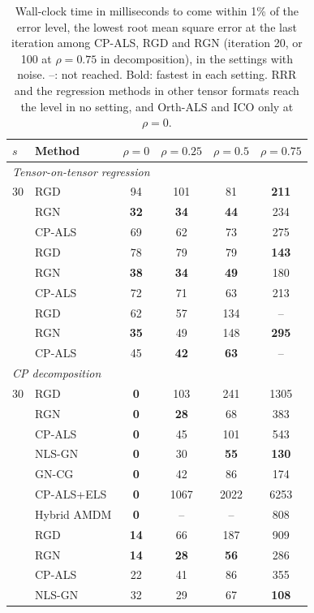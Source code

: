 \begin{table}[!htbp]
\centering
\caption{Wall-clock time in milliseconds to come within 1\% of the error level, the lowest root mean square error at the last iteration among CP-ALS, RGD and RGN (iteration 20, or 100 at $\rho=0.75$ in decomposition), in the settings with noise. --: not reached. Bold: fastest in each setting. RRR and the regression methods in other tensor formats reach the level in no setting, and Orth-ALS and ICO only at $\rho=0$.}
\label{tab:time_to_level}
{\small
\begin{tabular}{llcccc}
\toprule
$s$ & Method & $\rho=0$ & $\rho=0.25$ & $\rho=0.5$ & $\rho=0.75$ \\
\midrule
\multicolumn{6}{l}{\emph{Tensor-on-tensor regression}} \\
30 & RGD & 94 & 101 & 81 & \textbf{211} \\
 & RGN & \textbf{32} & \textbf{34} & \textbf{44} & 234 \\
 & CP-ALS & 69 & 62 & 73 & 275 \\
\addlinespace
10 & RGD & 78 & 79 & 79 & \textbf{143} \\
 & RGN & \textbf{38} & \textbf{34} & \textbf{49} & 180 \\
 & CP-ALS & 72 & 71 & 63 & 213 \\
\addlinespace
3 & RGD & 62 & 57 & 134 & -- \\
 & RGN & \textbf{35} & 49 & 148 & \textbf{295} \\
 & CP-ALS & 45 & \textbf{42} & \textbf{63} & -- \\
\midrule
\multicolumn{6}{l}{\emph{CP decomposition}} \\
30 & RGD & \textbf{0} & 103 & 241 & 1305 \\
 & RGN & \textbf{0} & \textbf{28} & 68 & 383 \\
 & CP-ALS & \textbf{0} & 45 & 101 & 543 \\
 & NLS-GN & \textbf{0} & 30 & \textbf{55} & \textbf{130} \\
 & GN-CG & \textbf{0} & 42 & 86 & 174 \\
 & CP-ALS+ELS & \textbf{0} & 1067 & 2022 & 6253 \\
 & Hybrid AMDM & \textbf{0} & -- & -- & 808 \\
\addlinespace
10 & RGD & \textbf{14} & 66 & 187 & 909 \\
 & RGN & \textbf{14} & \textbf{28} & \textbf{56} & 286 \\
 & CP-ALS & 22 & 41 & 86 & 355 \\
 & NLS-GN & 32 & 29 & 67 & \textbf{108} \\

\end{tabular}}
\end{table}
